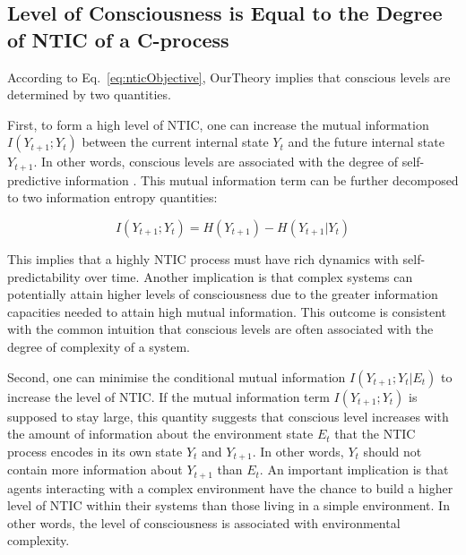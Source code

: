 \documentclass[utf8]{article}
\begin{document}
		
	    \subsection{Level of Consciousness is Equal to the Degree of NTIC of a C-process}\label{sec:cl}
            According to Eq.~\ref{eq:nticObjective}, \ac{OurTheory} implies that conscious levels are determined by two quantities. 
            
            First, to form a high level of NTIC, one can increase the mutual information $I(Y_{t+1};Y_{t})$ between the current internal state $Y_t$ and the future internal state $Y_{t+1}$. In other words, conscious levels are associated with the degree of self-predictive information \citep{bialek2001predictability}. This mutual information term can be further decomposed to two information entropy quantities: 
            
            \begin{equation}
            \label{eq:SelfEntropy}
            I(Y_{t+1};Y_{t}) = H(Y_{t+1}) - H(Y_{t+1}|Y_t)
            \end{equation}
            
            This implies that a highly NTIC process must have rich dynamics with self-predictability over time. Another implication is that complex systems can potentially attain higher levels of consciousness due to the greater information capacities needed to attain high mutual information. This outcome is consistent with the common intuition that conscious levels are often associated with the degree of complexity of a system.
    
    	    Second, one can minimise the conditional mutual information $I(Y_{t+1};Y_{t}|E_{t})$ to increase the level of NTIC. If the mutual information term $I(Y_{t+1};Y_t)$ is supposed to stay large, this quantity suggests that conscious level increases with the amount of information about the environment state $E_t$ that the NTIC process encodes in its own state $Y_t$ and $Y_{t+1}$. In other words, $Y_t$ should not contain more information about $Y_{t+1}$ than $E_t$. An important implication is that agents interacting with a complex environment have the chance to build a higher level of NTIC within their systems than those living in a simple environment. In other words, the level of consciousness is associated with environmental complexity. 
    	   
\end{document}
